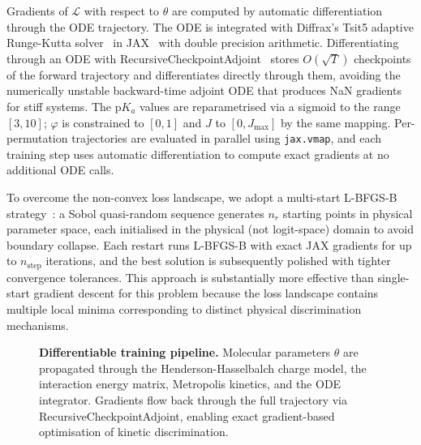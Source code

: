 \documentclass[10pt,twocolumn]{article}
\begin{document}
Gradients of $\mathcal{L}$ with respect to $\theta$ are computed by automatic differentiation through the ODE trajectory.
The ODE is integrated with Diffrax's Tsit5 adaptive Runge-Kutta solver~\cite{kidger2022} in JAX~\cite{jax2018} with double precision arithmetic.
Differentiating through an ODE with RecursiveCheckpointAdjoint~\cite{kidger2022} stores $O(\sqrt{T})$ checkpoints of the forward trajectory and differentiates directly through them, avoiding the numerically unstable backward-time adjoint ODE that produces NaN gradients for stiff systems.
The $\mathrm{p}K_a$ values are reparametrised via a sigmoid to the range $[3, 10]$; $\varphi$ is constrained to $[0,1]$ and $J$ to $[0, J_{\max}]$ by the same mapping.
Per-permutation trajectories are evaluated in parallel using \texttt{jax.vmap}, and each training step uses automatic differentiation to compute exact gradients at no additional ODE calls.

To overcome the non-convex loss landscape, we adopt a multi-start L-BFGS-B strategy~\cite{kingma2014}: a Sobol quasi-random sequence generates $n_r$ starting points in physical parameter space, each initialised in the physical (not logit-space) domain to avoid boundary collapse.
Each restart runs L-BFGS-B with exact JAX gradients for up to $n_\mathrm{step}$ iterations, and the best solution is subsequently polished with tighter convergence tolerances.
This approach is substantially more effective than single-start gradient descent for this problem because the loss landscape contains multiple local minima corresponding to distinct physical discrimination mechanisms.

\begin{figure}[H]
  \centering
  \caption{\textbf{Differentiable training pipeline.}
    Molecular parameters $\theta$ are propagated through the
    Henderson-Hasselbalch charge model, the interaction energy matrix,
    Metropolis kinetics, and the ODE integrator.
    Gradients flow back through the full trajectory via
    RecursiveCheckpointAdjoint, enabling exact gradient-based
    optimisation of kinetic discrimination.}
  \label{fig:training}
\end{figure}
\end{document}
